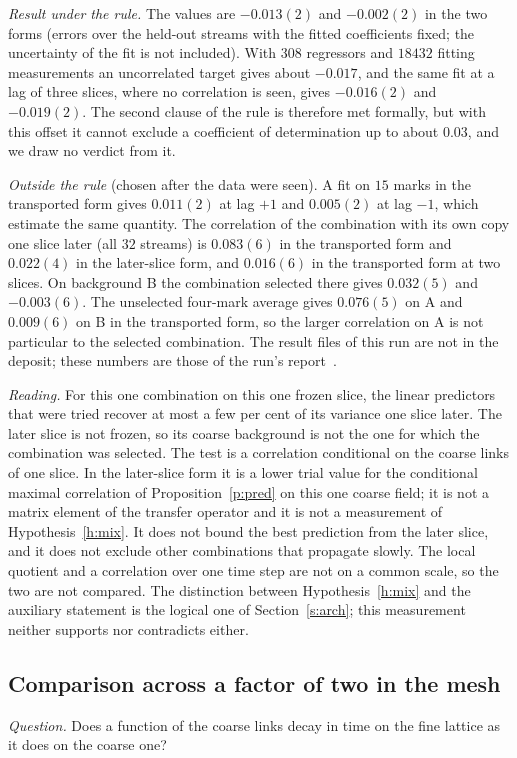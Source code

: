 \emph{Result under the rule.} The values are $-0.013(2)$ and $-0.002(2)$ in the two forms (errors over the
held-out streams with the fitted coefficients fixed; the uncertainty of the fit is not included). With $308$
regressors and $18432$ fitting measurements an uncorrelated target gives about $-0.017$, and the same fit at a
lag of three slices, where no correlation is seen, gives $-0.016(2)$ and $-0.019(2)$. The second clause of the
rule is therefore met formally, but with this offset it cannot exclude a coefficient of determination up to
about $0.03$, and we draw no verdict from it.

\emph{Outside the rule} (chosen after the data were seen). A fit on $15$ marks in the transported form gives
$0.011(2)$ at lag $+1$ and $0.005(2)$ at lag $-1$, which estimate the same quantity. The correlation of the
combination with its own copy one slice later (all $32$ streams) is $0.083(6)$ in the transported form and
$0.022(4)$ in the later-slice form, and $0.016(6)$ in the transported form at two slices. On background B the
combination selected there gives $0.032(5)$ and $-0.003(6)$. The unselected four-mark average gives $0.076(5)$
on A and $0.009(6)$ on B in the transported form, so the larger correlation on A is not particular to the
selected combination. The result files of this run are not in the deposit; these numbers are those of the
run's report~\cite{RepoData}.

\emph{Reading.} For this one combination on this one frozen slice, the linear predictors that were tried
recover at most a few per cent of its variance one slice later. The later slice is not frozen, so its coarse
background is not the one for which the combination was selected. The test is a correlation conditional on
the coarse links of one slice. In the later-slice form it is a lower trial value for the conditional maximal
correlation of Proposition~\ref{p:pred} on this one coarse field; it is not a matrix element of the transfer
operator and it is not a measurement of Hypothesis~\ref{h:mix}. It does not bound the best prediction from the later slice, and it does not exclude
other combinations that propagate slowly. The local quotient and a correlation over one time step are not on
a common scale, so the two are not compared. The distinction between Hypothesis~\ref{h:mix} and the auxiliary
statement is the logical one of Section~\ref{s:arch}; this measurement neither supports nor contradicts
either.

\subsection{Comparison across a factor of two in the mesh}\label{s:cross}
\emph{Question.} Does a function of the coarse links decay in time on the fine lattice as it does on the
coarse one?

